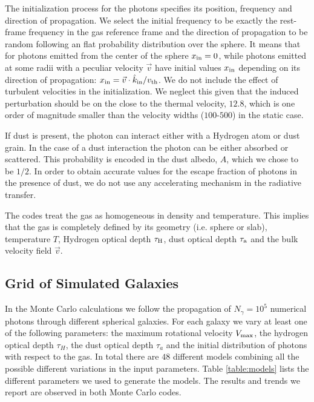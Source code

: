 \documentclass{emulateapj}
\newcommand{\ly}{{\ifmmode{{\rm Ly}\alpha~}\else{Ly$\alpha$~}\fi}}
\newcommand{\kms}{{\ifmmode{{\mathrm{\,km\ s}^{-1}}}\else{\,km~s$^{-1}$}\fi}}
\begin{document}
The initialization process for the \ly photons specifies its
position, frequency and direction of propagation. 
We select the initial frequency to be exactly the \ly rest-frame
frequency in the gas reference frame and the direction of propagation
to be random following an flat probability distribution over the sphere.  
It means that for photons emitted from the center of the sphere
$x_{\rm in}=0$, while photons emitted at some radii with a peculiar
velocity $\vec{v}$ have initial values $x_{\rm in}$ depending on its direction of
propagation: $x_{\rm   in}=\vec{v}\cdot\hat{k}_{\rm in}/v_{\rm th}$.
We do not include the effect of turbulent velocities in the
initialization.
We neglect this given that the induced perturbation should be on the
close to the thermal velocity, $12.8$\kms, which is one order of
magnitude smaller than the velocity widths ($100$-$500$\kms) in the
static case. 


If dust is present, the photon can interact either with a Hydrogen
atom or dust grain.
In the case of a dust interaction the photon can be either absorbed or
scattered.
This probability is encoded in the dust albedo, $A$, which we chose
to be $1/2$. 
In order to obtain accurate values for the escape fraction of
photons in the presence of dust, we do not use any accelerating
mechanism in the radiative transfer. 


The codes treat the gas as homogeneous in density and temperature.  
This implies that the gas is completely defined by its geometry
(i.e. sphere or slab), temperature $T$, Hydrogen optical depth
$\tau_{\rm H}$, dust optical depth $\tau_{\rm a}$ and the bulk
velocity field $\vec{v}$.  



\subsection{Grid of Simulated Galaxies}
\label{sec:models}

In the Monte Carlo calculations we follow the propagation of $N_{\gamma}=10^5$
numerical photons through different spherical galaxies. 
For each galaxy we vary at least one of the following parameters: the maximum
rotational velocity $V_{\rm max}$, the hydrogen optical depth $\tau_{H}$,
the dust optical depth $\tau_{a}$ and the initial distribution of photons
with respect to the gas. 
In total there are $48$ different models combining all the possible
different variations in the input parameters.
Table \ref{table:models} lists the different parameters we used to
generate the models. The results and trends we report are observed in both 
Monte Carlo codes.
\end{document}
